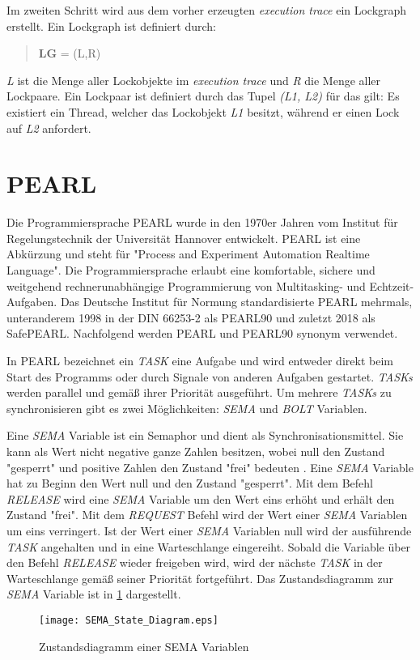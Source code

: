 Im zweiten Schritt wird aus dem vorher erzeugten \emph{execution trace} ein
Lockgraph erstellt. Ein Lockgraph ist definiert durch:
\begin{quote}
\textbf{LG} = (L,R)
\end{quote}
\emph{L} ist die Menge aller Lockobjekte im \emph{execution trace} und \emph{R}
die Menge aller Lockpaare. Ein Lockpaar ist definiert durch das Tupel \emph{(L1,
L2)} für das gilt: Es existiert ein Thread, welcher das Lockobjekt \emph{L1}
besitzt, während er einen Lock auf \emph{L2} anfordert.

\section{PEARL}
\label{section:PEARL}
Die Programmiersprache PEARL wurde in den 1970er Jahren vom Institut für
Regelungstechnik der Universität Hannover entwickelt\autocite{PEARLHistory}.
PEARL ist eine Abkürzung und steht für "Process and Experiment Automation
Realtime Language". Die Programmiersprache erlaubt eine komfortable, sichere und
weitgehend rechnerunabhängige Programmierung von Multitasking- und
Echtzeit-Aufgaben. Das Deutsche Institut für Normung standardisierte PEARL
mehrmals, unteranderem 1998 in der DIN 66253-2 als
PEARL90\autocite{DIN-66253-2:1998-04} und zuletzt 2018 als
SafePEARL\autocite{DIN-66253:2018-03}. Nachfolgend werden PEARL und PEARL90
synonym verwendet. 

In PEARL bezeichnet ein \emph{TASK} eine Aufgabe und wird entweder direkt beim
Start des Programms oder durch Signale von anderen Aufgaben gestartet.
\emph{TASKs} werden parallel und gemäß ihrer Priorität ausgeführt. Um mehrere
\emph{TASKs} zu synchronisieren gibt es zwei Möglichkeiten: \emph{SEMA} und
\emph{BOLT} Variablen. 

Eine \emph{SEMA} Variable ist ein Semaphor und dient als Synchronisationsmittel.
Sie kann als Wert nicht negative ganze Zahlen besitzen, wobei null den Zustand
"gesperrt" und positive Zahlen den Zustand "frei" bedeuten
\autocite[9--17]{PEARL}. Eine \emph{SEMA} Variable hat zu Beginn den Wert null
und den Zustand "gesperrt". Mit dem Befehl \emph{RELEASE} wird eine \emph{SEMA}
Variable um den Wert eins erhöht und erhält den Zustand "frei". Mit dem
\emph{REQUEST} Befehl wird der Wert einer \emph{SEMA} Variablen um eins
verringert. Ist der Wert einer \emph{SEMA} Variablen null wird der ausführende
\emph{TASK} angehalten und in eine Warteschlange eingereiht. Sobald die Variable
über den Befehl \emph{RELEASE} wieder freigeben wird, wird der nächste
\emph{TASK} in der Warteschlange gemäß seiner Priorität fortgeführt. Das
Zustandsdiagramm zur \emph{SEMA} Variable ist in \cref{fig:SEMA_StateDiagram}
dargestellt.
\begin{figure}[ht]
  \texttt{[image: SEMA\_State\_Diagram.eps]}
  \caption{Zustandsdiagramm einer SEMA Variablen}
  \label{fig:SEMA_StateDiagram}
\end{figure}

